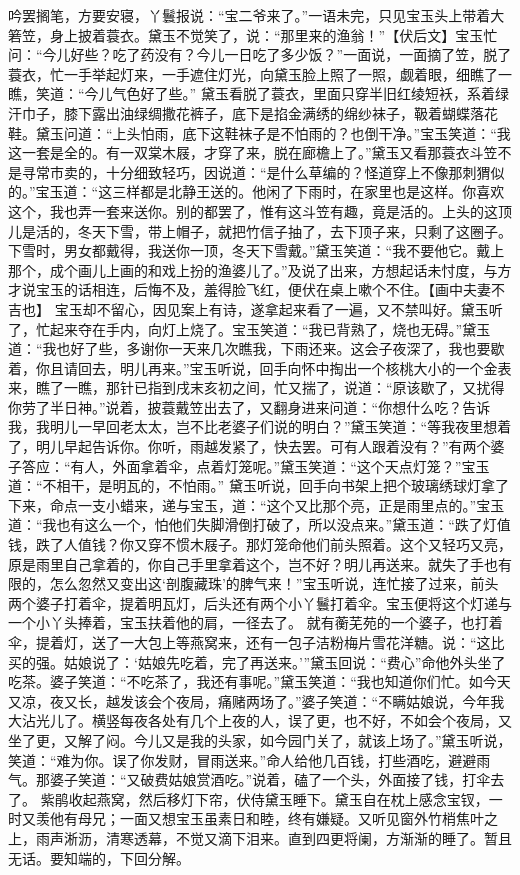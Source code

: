 \documentclass[12pt,oneside]{book}
\begin{document}
吟罢搁笔，方要安寝，丫鬟报说：“宝二爷来了。”一语未完，只见宝玉头上带着大箬笠，身上披着蓑衣。黛玉不觉笑了，说：“那里来的渔翁！”【伏后文】宝玉忙问：“今儿好些？吃了药没有？今儿一日吃了多少饭？”一面说，一面摘了笠，脱了蓑衣，忙一手举起灯来，一手遮住灯光，向黛玉脸上照了一照，觑着眼，细瞧了一瞧，笑道：“今儿气色好了些。”
黛玉看脱了蓑衣，里面只穿半旧红绫短袄，系着绿汗巾子，膝下露出油绿绸撒花裤子，底下是掐金满绣的绵纱袜子，靸着蝴蝶落花鞋。黛玉问道：“上头怕雨，底下这鞋袜子是不怕雨的？也倒干净。”宝玉笑道：“我这一套是全的。有一双棠木屐，才穿了来，脱在廊檐上了。”黛玉又看那蓑衣斗笠不是寻常市卖的，十分细致轻巧，因说道：“是什么草编的？怪道穿上不像那刺猬似的。”宝玉道：“这三样都是北静王送的。他闲了下雨时，在家里也是这样。你喜欢这个，我也弄一套来送你。别的都罢了，惟有这斗笠有趣，竟是活的。上头的这顶儿是活的，冬天下雪，带上帽子，就把竹信子抽了，去下顶子来，只剩了这圈子。下雪时，男女都戴得，我送你一顶，冬天下雪戴。”黛玉笑道：“我不要他它。戴上那个，成个画儿上画的和戏上扮的渔婆儿了。”及说了出来，方想起话未忖度，与方才说宝玉的话相连，后悔不及，羞得脸飞红，便伏在桌上嗽个不住。【画中夫妻不吉也】
宝玉却不留心，因见案上有诗，遂拿起来看了一遍，又不禁叫好。黛玉听了，忙起来夺在手内，向灯上烧了。宝玉笑道：“我已背熟了，烧也无碍。”黛玉道：“我也好了些，多谢你一天来几次瞧我，下雨还来。这会子夜深了，我也要歇着，你且请回去，明儿再来。”宝玉听说，回手向怀中掏出一个核桃大小的一个金表来，瞧了一瞧，那针已指到戌末亥初之间，忙又揣了，说道：“原该歇了，又扰得你劳了半日神。”说着，披蓑戴笠出去了，又翻身进来问道：“你想什么吃？告诉我，我明儿一早回老太太，岂不比老婆子们说的明白？”黛玉笑道：“等我夜里想着了，明儿早起告诉你。你听，雨越发紧了，快去罢。可有人跟着没有？”有两个婆子答应：“有人，外面拿着伞，点着灯笼呢。”黛玉笑道：“这个天点灯笼？”宝玉道：“不相干，是明瓦的，不怕雨。”
黛玉听说，回手向书架上把个玻璃绣球灯拿了下来，命点一支小蜡来，递与宝玉，道：“这个又比那个亮，正是雨里点的。”宝玉道：“我也有这么一个，怕他们失脚滑倒打破了，所以没点来。”黛玉道：“跌了灯值钱，跌了人值钱？你又穿不惯木屐子。那灯笼命他们前头照着。这个又轻巧又亮，原是雨里自己拿着的，你自己手里拿着这个，岂不好？明儿再送来。就失了手也有限的，怎么忽然又变出这‘剖腹藏珠’的脾气来！”宝玉听说，连忙接了过来，前头两个婆子打着伞，提着明瓦灯，后头还有两个小丫鬟打着伞。宝玉便将这个灯递与一个小丫头捧着，宝玉扶着他的肩，一径去了。
就有蘅芜苑的一个婆子，也打着伞，提着灯，送了一大包上等燕窝来，还有一包子洁粉梅片雪花洋糖。说：“这比买的强。姑娘说了：‘姑娘先吃着，完了再送来。’”黛玉回说：“费心”命他外头坐了吃茶。婆子笑道：“不吃茶了，我还有事呢。”黛玉笑道：“我也知道你们忙。如今天又凉，夜又长，越发该会个夜局，痛赌两场了。”婆子笑道：“不瞒姑娘说，今年我大沾光儿了。横竖每夜各处有几个上夜的人，误了更，也不好，不如会个夜局，又坐了更，又解了闷。今儿又是我的头家，如今园门关了，就该上场了。”黛玉听说，笑道：“难为你。误了你发财，冒雨送来。”命人给他几百钱，打些酒吃，避避雨气。那婆子笑道：“又破费姑娘赏酒吃。”说着，磕了一个头，外面接了钱，打伞去了。
紫鹃收起燕窝，然后移灯下帘，伏侍黛玉睡下。黛玉自在枕上感念宝钗，一时又羡他有母兄；一面又想宝玉虽素日和睦，终有嫌疑。又听见窗外竹梢焦叶之上，雨声淅沥，清寒透幕，不觉又滴下泪来。直到四更将阑，方渐渐的睡了。暂且无话。要知端的，下回分解。
\end{document}
